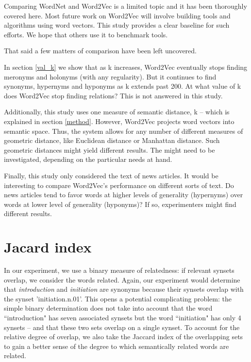 \documentclass{article}
\begin{document}
Comparing WordNet and Word2Vec is a limited topic and it has been thoroughly covered here. Most future work on Word2Vec will involve building tools and algorithms using word vectors. This study provides a clear baseline for such efforts. We hope that others use it to benchmark tools. 

That said a few matters of comparison have been left uncovered. 

In section \ref{val_k} we show that as k increases, Word2Vec eventually stops finding meronyms and holonyms (with any regularity). But it continues to find synonyms, hypernyms and hyponyms as k extends past 200. At what value of k does Word2Vec stop finding relations? This is not answered in this study.

Additionally, this study uses one measure of semantic distance, k -- which is explained in section \ref{method}.
However, Word2Vec projects word vectors into semantic space. Thus, the system allows for any number of different measures of geometric distance, like Euclidean distance or Manhattan distance. Such geometric distances might yield different results. The might need to be investigated, depending on the particular needs at hand. 

Finally, this study only considered the text of news articles. It would be interesting to compare Word2Vec's performance on different sorts of text. Do news articles tend to favor words at higher levels of generality (hypernyms) over words at lower level of generality (hyponyms)? If so, experimenters might find different results. 

\appendix
\section{Jacard index}
In our experiment, we use a binary measure of relatedness: if relevant synsets overlap, we consider the words related. Again, our experiment would determine that \textit{introduction} and \textit{initiation} are synonyms because their synsets overlap with the synset 'initiation.n.01'.  This opens a potential complicating problem: the simple binary determination does not take into account that the word ``introduction" has seven associated synsets but the word ``initiation" has only 4 synsets -- and that these two sets overlap on a single synset. To account for the relative degree of overlap, we also take the Jaccard index of the overlapping sets to gain a better sense of the degree to which semantically related words are related.
\end{document}
